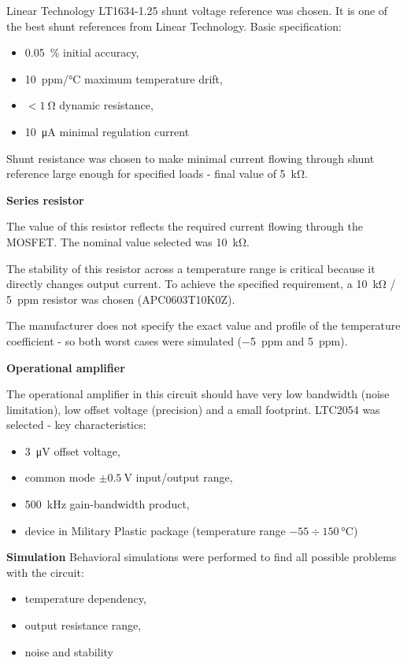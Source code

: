         Linear Technology LT1634-1.25 shunt voltage reference was chosen. It is one of the best shunt references from Linear Technology. Basic specification:
        \begin{itemize}
            \item \SI{0.05}{\percent} initial accuracy,
            \item \SI{10}{ppm/\degreeCelsius} maximum temperature drift,
            \item $< \SI{1}{\ohm}$ dynamic resistance,
            \item \SI{10}{\uA} minimal regulation current
        \end{itemize}

        Shunt resistance was chosen to make minimal current flowing through shunt reference large enough for specified loads - final value of \SI{5}{\kilo\ohm}.

        \bigskip \textbf{Series resistor}

        The value of this resistor reflects the required current flowing through the MOSFET. The nominal value selected was \SI{10}{\kilo\ohm}.

        The stability of this resistor across a temperature range is critical because it directly changes output current. To achieve the specified requirement, a \SI{10}{\kilo\ohm} / \SI{5}{ppm} resistor was chosen (APC0603T10K0Z).

        The manufacturer does not specify the exact value and profile of the temperature coefficient - so both worst cases were simulated (\SI{-5}{ppm} and \SI{5}{ppm}).

        \bigskip \textbf{Operational amplifier}

        The operational amplifier in this circuit should have very low bandwidth (noise limitation), low offset voltage (precision) and a small footprint. LTC2054 was selected - key characteristics:
        \begin{itemize}
            \item \SI{3}{\micro\volt} offset voltage,
            \item common mode $\pm \SI{0.5}{\volt}$ input/output range,
            \item \SI{500}{\kilo\hertz} gain-bandwidth product,
            \item device in Military Plastic package (temperature range $-55 \div \SI{150}{\degreeCelsius}$)
        \end{itemize}

        \bigskip \textbf{Simulation}
        Behavioral simulations were performed to find all possible problems with the circuit:
        \begin{itemize}
            \item temperature dependency,
            \item output resistance range,
            \item noise and stability
        \end{itemize}

